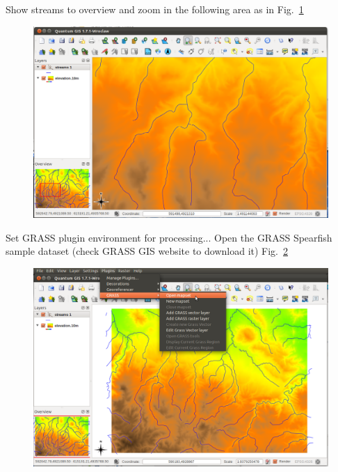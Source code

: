 Show streams to overview and zoom in the following area as in Fig.~\ref{fig:qgis028}

\begin{figure}[htbp]
   \centering
   \includegraphics[scale=0.2]{qgis028.png}
   \caption{}
   \label{fig:qgis028}
\end{figure}

Set GRASS plugin environment for processing... Open the GRASS Spearfish sample dataset (check GRASS GIS website to download it) Fig.~\ref{fig:qgis029}

\begin{figure}[htbp]
   \centering
   \includegraphics[scale=0.25]{qgis029.png}
   \caption{}
   \label{fig:qgis029}
\end{figure}

